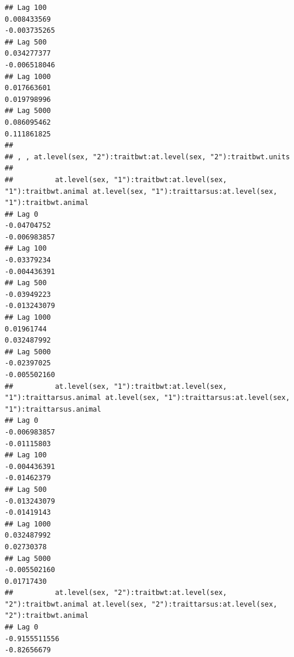 \documentclass[
  12pt,
]{book}
\begin{document}
\begin{verbatim}
## Lag 100                                                       0.008433569                                                        -0.003735265
## Lag 500                                                       0.034277377                                                        -0.006518046
## Lag 1000                                                      0.017663601                                                         0.019798996
## Lag 5000                                                      0.086095462                                                         0.111861825
## 
## , , at.level(sex, "2"):traitbwt:at.level(sex, "2"):traitbwt.units
## 
##          at.level(sex, "1"):traitbwt:at.level(sex, "1"):traitbwt.animal at.level(sex, "1"):traittarsus:at.level(sex, "1"):traitbwt.animal
## Lag 0                                                       -0.04704752                                                      -0.006983857
## Lag 100                                                     -0.03379234                                                      -0.004436391
## Lag 500                                                     -0.03949223                                                      -0.013243079
## Lag 1000                                                     0.01961744                                                       0.032487992
## Lag 5000                                                    -0.02397025                                                      -0.005502160
##          at.level(sex, "1"):traitbwt:at.level(sex, "1"):traittarsus.animal at.level(sex, "1"):traittarsus:at.level(sex, "1"):traittarsus.animal
## Lag 0                                                         -0.006983857                                                          -0.01115803
## Lag 100                                                       -0.004436391                                                          -0.01462379
## Lag 500                                                       -0.013243079                                                          -0.01419143
## Lag 1000                                                       0.032487992                                                           0.02730378
## Lag 5000                                                      -0.005502160                                                           0.01717430
##          at.level(sex, "2"):traitbwt:at.level(sex, "2"):traitbwt.animal at.level(sex, "2"):traittarsus:at.level(sex, "2"):traitbwt.animal
## Lag 0                                                     -0.9155511556                                                       -0.82656679

\end{verbatim}
\end{document}

